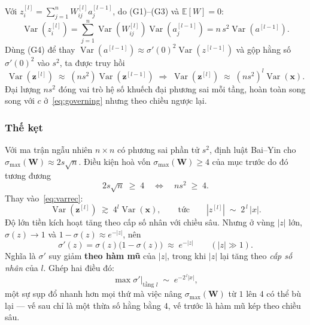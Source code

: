 Với $z^{[l]}_i = \sum_{j=1}^{n} W^{[l]}_{ij}a^{[l-1]}_j$, do (G1)--(G3) và
$\mathbb{E}[W]=0$:
\[
  \operatorname{Var}\!\left(z^{[l]}_i\right)
  = \sum_{j=1}^{n}\operatorname{Var}\!\left(W^{[l]}_{ij}\right)
                  \operatorname{Var}\!\left(a^{[l-1]}_j\right)
  = n\,s^2\operatorname{Var}\!\left(a^{[l-1]}\right).
\]
Dùng (G4) để thay $\operatorname{Var}(a^{[l-1]})\approx\sigma'(0)^2
\operatorname{Var}(z^{[l-1]})$ và gộp hằng số $\sigma'(0)^2$ vào $s^2$, ta được
truy hồi
\begin{equation}
  \operatorname{Var}\!\left(\mathbf{z}^{[l]}\right)
  \;\approx\; \left(n s^2\right)\operatorname{Var}\!\left(\mathbf{z}^{[l-1]}\right)
  \;\Longrightarrow\;
  \operatorname{Var}\!\left(\mathbf{z}^{[l]}\right)
  \;\approx\; \left(n s^2\right)^{l}\operatorname{Var}\!\left(\mathbf{x}\right).
  \label{eq:varrec}
\end{equation}
Đại lượng $n s^2$ đóng vai trò hệ số khuếch đại phương sai mỗi tầng, hoàn toàn
song song với $c$ ở~\eqref{eq:governing} nhưng theo chiều ngược lại.

\subsubsection{Thế kẹt}

Với ma trận ngẫu nhiên $n\times n$ có phương sai phần tử $s^2$, định luật
Bai--Yin cho $\sigma_{\max}(\mathbf{W})\approx 2s\sqrt{n}$. Điều kiện hoà vốn
$\sigma_{\max}(\mathbf{W})\ge4$ của mục trước do đó tương đương
\[
  2s\sqrt{n}\;\ge\;4
  \quad\Longleftrightarrow\quad
  n s^2 \;\ge\; 4 .
\]
Thay vào~\eqref{eq:varrec}:
\[
  \operatorname{Var}\!\left(\mathbf{z}^{[l]}\right)\;\gtrsim\;4^{l}\operatorname{Var}(\mathbf{x}),
  \qquad\text{tức}\qquad
  \left|z^{[l]}\right| \;\sim\; 2^{\,l}\,\left|x\right| .
\]
Độ lớn tiền kích hoạt tăng theo cấp số nhân với chiều sâu. Nhưng ở vùng $|z|$
lớn, $\sigma(z)\to1$ và $1-\sigma(z)\approx e^{-|z|}$, nên
\begin{equation}
  \sigma'(z) = \sigma(z)\bigl(1-\sigma(z)\bigr) \;\approx\; e^{-|z|}
  \qquad (|z|\gg1).
  \label{eq:expdecay}
\end{equation}
Nghĩa là $\sigma'$ suy giảm \textbf{theo hàm mũ} của $|z|$, trong khi $|z|$ lại
tăng theo \emph{cấp số nhân} của $l$. Ghép hai điều đó:
\[
  \max\sigma'\big|_{\text{tầng }l}\;\sim\;e^{-2^{\,l}|x|},
\]
một sự sụp đổ nhanh hơn mọi thứ mà việc nâng $\sigma_{\max}(\mathbf{W})$ từ $1$
lên $4$ có thể bù lại --- vế sau chỉ là một thừa số hằng bằng $4$, vế trước là
hàm mũ kép theo chiều sâu.

